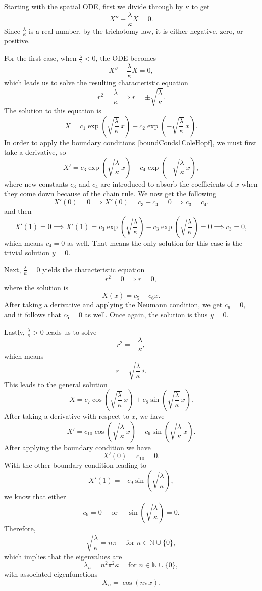 \documentclass[undefended]{sfuthesis}
\begin{document}
Starting with the spatial ODE, first we divide through by $\kappa$ to get \[X'' + \frac{\lambda}{\kappa} X = 0.\] Since $\frac{\lambda}{\kappa}$ is a real number, by the trichotomy law, it is either negative, zero, or positive.

For the first case, when $\frac{\lambda}{\kappa} < 0$, the ODE becomes \[X'' - \frac{\lambda}{\kappa} X = 0,\] which leads us to solve the resulting characteristic equation \[r^2 = \frac{\lambda}{\kappa} \implies r = \pm \sqrt{\frac{\lambda}{\kappa}}.\] The solution to this equation is \[X = c_1 \exp \left(\sqrt{\frac{\lambda}{\kappa}} \,x \right) + c_2 \exp \left(-\sqrt{\frac{\lambda}{\kappa}} \,x \right).\] In order to apply the boundary conditions \eqref{boundConds1ColeHopf}, we must first take a derivative, so \[X' = c_3 \exp \left(\sqrt{\frac{\lambda}{\kappa}} \,x \right) - c_4 \exp \left(-\sqrt{\frac{\lambda}{\kappa}} \,x \right),\] where new constants $c_3$ and $c_4$ are introduced to absorb the coefficients of $x$ when they come down because of the chain rule. We now get the following \[X'(0) = 0 \implies X'(0) = c_3 - c_4 = 0 \implies c_3 = c_4.\] and then
\[X'(1) = 0 \implies X'(1) = c_3 \exp \left( \sqrt{ \frac{\lambda}{\kappa}} \right) - c_3 \exp \left( \sqrt{ \frac{\lambda}{\kappa}} \right) = 0 \implies c_3 = 0,\] which means $c_4 = 0$ as well. That means the only solution for this case is the trivial solution $y = 0.$

Next, $\frac{\lambda}{\kappa} = 0$ yields the characteristic equation \[r^2 = 0 \implies r = 0,\] where the solution is \[X(x) = c_5 + c_6 x.\] After taking a derivative and applying the Neumann condition, we get $c_6 = 0,$ and it follows that $c_5 = 0$ as well. Once again, the solution is thus $y = 0.$

Lastly, $\frac{\lambda}{\kappa} > 0$ leads us to solve \[r^2 = -\frac{\lambda}{\kappa},\] which means \[r = \sqrt{\frac{\lambda}{\kappa}} \,i.\] This leads to the general solution \[X = c_7 \cos \left( \sqrt{ \frac{\lambda}{\kappa}} \,x \right) + c_8 \sin \left( \sqrt{ \frac{\lambda}{\kappa}} \,x \right) .\] After taking a derivative with respect to $x$, we have \[X' = c_{10} \cos \left( \sqrt{ \frac{\lambda}{\kappa}} \, x \right) - c_9 \sin \left( \sqrt{ \frac{\lambda}{\kappa}} \, x  \right).\] After applying the boundary condition we have \[X'(0) = c_{10} = 0.\] With the other boundary condition leading to \[X'(1) = - c_9 \sin \left( \sqrt{ \frac{\lambda}{\kappa}} \right),\] we know that either \[c_9 = 0 \quad \text{ or } \quad \sin \left( \sqrt{ \frac{\lambda}{\kappa}} \right) = 0.\] Therefore, \[\sqrt{\frac{\lambda}{\kappa}} = n \pi \quad \text{ for } n \in \mathbb{N} \cup \{0\}, \] which implies that the eigenvalues are \[\lambda_n = n^2 \pi^2 \kappa \quad \text{ for } n \in \mathbb{N} \cup \{0\},\] with associated eigenfunctions \[X_n = \cos \left(n \pi x\right).\]
\end{document}
